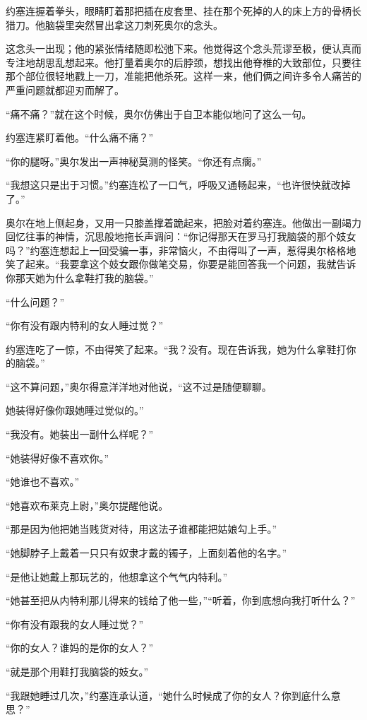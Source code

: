     约塞连握着拳头，眼睛盯着那把插在皮套里、挂在那个死掉的人的床上方的骨柄长猎刀。他脑袋里突然冒出拿这刀刺死奥尔的念头。

    这念头一出现；他的紧张情绪随即松弛下来。他觉得这个念头荒谬至极，便认真而专注地胡思乱想起来。他打量着奥尔的后脖颈，想找出他脊椎的大致部位，只要往那个部位很轻地戳上一刀，准能把他杀死。这样一来，他们俩之间许多令人痛苦的严重问题就都迎刃而解了。

    “痛不痛？”就在这个时候，奥尔仿佛出于自卫本能似地问了这么一句。

    约塞连紧盯着他。“什么痛不痛？”

    “你的腿呀。”奥尔发出一声神秘莫测的怪笑。“你还有点瘸。”

    “我想这只是出于习惯。”约塞连松了一口气，呼吸又通畅起来，“也许很快就改掉了。”

    奥尔在地上侧起身，又用一只膝盖撑着跪起来，把脸对着约塞连。他做出一副竭力回忆往事的神情，沉思般地拖长声调问：“你记得那天在罗马打我脑袋的那个妓女吗？”约塞连想起上一回受骗一事，非常恼火，不由得叫了一声，惹得奥尔格格地笑了起来。“我要拿这个妓女跟你做笔交易，你要是能回答我一个问题，我就告诉你那天她为什么拿鞋打我的脑袋。”

    “什么问题？”

    “你有没有跟内特利的女人睡过觉？”

    约塞连吃了一惊，不由得笑了起来。“我？没有。现在告诉我，她为什么拿鞋打你的脑袋。”

    “这不算问题，”奥尔得意洋洋地对他说，“这不过是随便聊聊。

    她装得好像你跟她睡过觉似的。”

    “我没有。她装出一副什么样呢？”

    “她装得好像不喜欢你。”

    “她谁也不喜欢。”

    “她喜欢布莱克上尉，”奥尔提醒他说。

    “那是因为他把她当贱货对待，用这法子谁都能把姑娘勾上手。”

    “她脚脖子上戴着一只只有奴隶才戴的镯子，上面刻着他的名字。”

    “是他让她戴上那玩艺的，他想拿这个气气内特利。”

    “她甚至把从内特利那儿得来的钱给了他一些，”“听着，你到底想向我打听什么？”

    “你有没有跟我的女人睡过觉？”

    “你的女人？谁妈的是你的女人？”

    “就是那个用鞋打我脑袋的妓女。”

    “我跟她睡过几次，”约塞连承认道，“她什么时候成了你的女人？你到底什么意思？”

